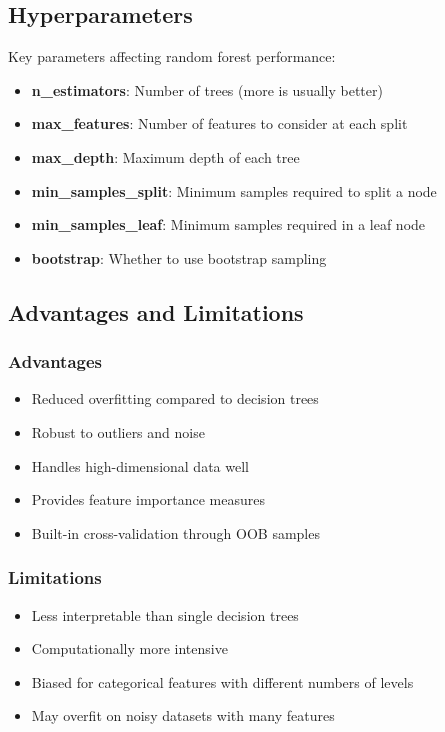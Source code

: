 \documentclass[
  letterpaper,
  DIV=11,
  numbers=noendperiod]{scrreprt}
\providecommand{\tightlist}{%
  \setlength{\itemsep}{0pt}\setlength{\parskip}{0pt}}\usepackage{longtable,booktabs,array}
\begin{document}
\subsection{Hyperparameters}\label{hyperparameters}

Key parameters affecting random forest performance:

\begin{itemize}
\tightlist
\item
  \textbf{n\_estimators}: Number of trees (more is usually better)
\item
  \textbf{max\_features}: Number of features to consider at each split
\item
  \textbf{max\_depth}: Maximum depth of each tree
\item
  \textbf{min\_samples\_split}: Minimum samples required to split a node
\item
  \textbf{min\_samples\_leaf}: Minimum samples required in a leaf node
\item
  \textbf{bootstrap}: Whether to use bootstrap sampling
\end{itemize}

\subsection{Advantages and
Limitations}\label{advantages-and-limitations-1}

\subsubsection{Advantages}\label{advantages-3}

\begin{itemize}
\tightlist
\item
  Reduced overfitting compared to decision trees
\item
  Robust to outliers and noise
\item
  Handles high-dimensional data well
\item
  Provides feature importance measures
\item
  Built-in cross-validation through OOB samples
\end{itemize}

\subsubsection{Limitations}\label{limitations-2}

\begin{itemize}
\tightlist
\item
  Less interpretable than single decision trees
\item
  Computationally more intensive
\item
  Biased for categorical features with different numbers of levels
\item
  May overfit on noisy datasets with many features
\end{itemize}
\end{document}
